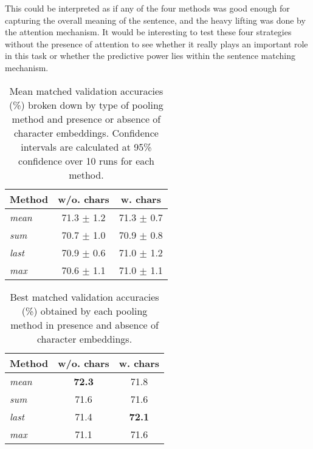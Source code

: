 \documentclass[11pt,letterpaper]{article}
\begin{document}
This could be interpreted as if any of the four methods was good enough for capturing the overall meaning of the sentence, and the heavy lifting was done by the attention mechanism. It would be interesting to test these four strategies without the presence of attention to see whether it really plays an important role in this task or whether the predictive power lies within the sentence matching mechanism.


\begin{table}[htb]
\centering
\begin{tabular}{lcc}
\textbf{Method}      & \textbf{w/o. chars}     &\textbf{w. chars}     \\ \hline
\hline
\textit{mean}          	& 71.3 $\pm$ 1.2	  & 71.3 $\pm$ 0.7	         \\ \hline
\textit{sum}       	    & 70.7 $\pm$ 1.0	  & 70.9 $\pm$ 0.8	         \\ \hline
\textit{last}           & 70.9 $\pm$ 0.6	  & 71.0 $\pm$ 1.2	         \\ \hline
\textit{max}        	& 70.6 $\pm$ 1.1	  & 71.0 $\pm$ 1.1	         \\ \hline
\hline
\end{tabular}


\caption{Mean matched validation accuracies (\%) broken down by type of pooling method and presence or absence of character embeddings. Confidence intervals are calculated at 95\% confidence over 10 runs for each method.}
\label{pool-results-table}
\end{table}

\begin{table}[htb]
\centering
\begin{tabular}{lcc}
\textbf{Method}      & \textbf{w/o. chars}     &\textbf{w. chars}     \\ \hline
\hline
\textit{mean}          	& \textbf{72.3} 	  & 71.8 	         \\ \hline
\textit{sum}       	    & 71.6 	  & 71.6 	         \\ \hline
\textit{last}           & 71.4 	  & \textbf{72.1} 	         \\ \hline
\textit{max}        	& 71.1 	  & 71.6 	         \\ \hline
\hline
\end{tabular}


\caption{Best matched validation accuracies (\%) obtained by each pooling method in presence and absence of character embeddings.}
\label{pool-best-results-table}
\end{table}
\end{document}
